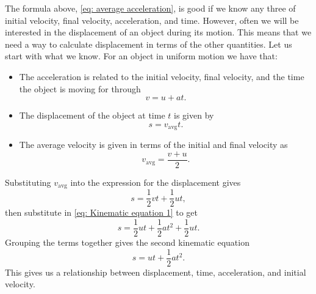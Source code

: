\documentclass[a4paper,12pt]{book}
\begin{document}
The formula above, \cref{eq: average acceleration}, is good if we know any three of initial velocity, final velocity, acceleration, and time. However, often we will be interested in the displacement of an object during its motion. This means that we need a way to calculate displacement in terms of the other quantities.  Let us start with what we know. For an object in uniform motion we have that:
\begin{itemize}
\setlength{\itemsep}{-5pt}
    \item The acceleration is related to the initial velocity, final velocity, and the time the object is moving for through
    \begin{equation*}
        v=u+at.
    \end{equation*}
    \item The displacement of the object at time $t$ is given by
    \begin{equation*}
        s=v_{\text{avg}}t.
    \end{equation*}
    \item The average velocity is given in terms of the initial and final velocity as 
    \begin{equation*}
        v_{\text{avg}}=\frac{v+u}{2}.
    \end{equation*}
\end{itemize}
Substituting $v_{\text{avg}}$ into the expression for the displacement gives
\begin{equation*}
    s=\frac{1}{2}vt+\frac{1}{2}ut,
\end{equation*}
then substitute in \cref{eq: Kinematic equation 1} to get
\begin{equation*}
    s=\frac{1}{2}ut+\frac{1}{2}at^{2}+\frac{1}{2}ut.
\end{equation*}
Grouping the terms together gives the second kinematic equation
\begin{equation}
    s=ut+\frac{1}{2}at^{2}.
    \label{eq: Kinematic equation 2}
\end{equation}
This gives us a relationship between displacement, time, acceleration, and initial velocity.
\end{document}
